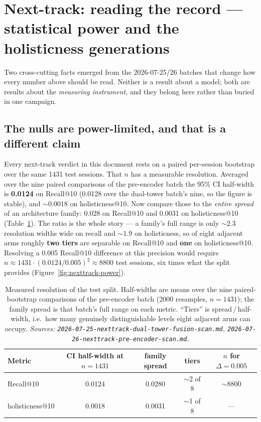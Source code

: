 \documentclass[11pt]{article}
\begin{document}
\section{Next-track: reading the record --- statistical power and the holisticness generations}
\label{sec:nexttrack-power}
Two cross-cutting facts emerged from the 2026-07-25/26 batches that change how
every number above should be read. Neither is a result about a model; both are
results about the \emph{measuring instrument}, and they belong here rather than
buried in one campaign.

\subsection{The nulls are power-limited, and that is a different claim}
\label{sec:nexttrack-power-stats}
Every next-track verdict in this document rests on a paired per-session
bootstrap over the
same \num{1431} test sessions. That $n$ has a measurable resolution. Averaged
over the nine paired comparisons of the pre-encoder batch the 95\% CI half-width
is \textbf{\num{0.0124}} on Recall@10 (\num{0.0128} over the dual-tower batch's
nine, so the figure is stable), and \textbf{${\sim}\num{0.0018}$} on
holisticness@10. Now compare those to the \emph{entire spread} of an architecture
family: \num{0.028} on Recall@10 and \num{0.0031} on holisticness@10
(Table~\ref{tab:nexttrack-power}). The ratio is the whole story --- a family's full range
is only ${\sim}2.3$ resolution widths wide on recall and ${\sim}1.9$ on
holisticness, so of eight adjacent arms roughly \textbf{two tiers} are separable
on Recall@10 and \textbf{one} on holisticness@10. Resolving a \num{0.005}
Recall@10 difference at this precision would require
$n \approx 1431\cdot(\num{0.0124}/\num{0.005})^2 \approx \num{8800}$ test
sessions, six times what the split provides
(Figure~\ref{fig:nexttrack-power}).

\begin{table}[ht]
  \centering
  \caption{Measured resolution of the test split. Half-widths are means over the
  nine paired-bootstrap comparisons of the pre-encoder batch (\num{2000}
  resamples, $n=\num{1431}$); the family spread is that batch's full range on
  each metric. ``Tiers'' is spread\,$/$\,half-width, i.e.\ how many genuinely
  distinguishable levels eight adjacent arms can occupy.
  \emph{Sources: \texttt{2026-07-25-nexttrack-dual-tower-fusion-scan.md},
  \texttt{2026-07-26-nexttrack-pre-encoder-scan.md}.}}
  \label{tab:nexttrack-power}
  {\footnotesize\setlength{\tabcolsep}{6pt}\begin{tabular}{lcccc}
    \toprule
    Metric & CI half-width at $n=\num{1431}$ & family spread & tiers & $n$ for $\Delta=\num{0.005}$ \\
    \midrule
    Recall@10 & 0.0124 & 0.0280 & $\sim$2 of 8 & $\sim$\num{8800} \\
    holisticness@10 & 0.0018 & 0.0031 & $\sim$1 of 8 & --- \\
    \bottomrule
  \end{tabular}}
\end{table}
\end{document}
